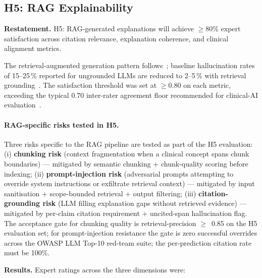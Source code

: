 
\subsection{H5: RAG Explainability}

\textbf{Restatement.} H5: RAG-generated explanations will achieve $\geq$80\% expert satisfaction across citation relevance, explanation coherence, and clinical alignment metrics.

\noindent The retrieval-augmented generation pattern follows~\cite{lewis2020rag}; baseline hallucination rates of 15--25\,\% reported for ungrounded LLMs are reduced to 2--5\,\% with retrieval grounding~\cite{gao2024rag}. The satisfaction threshold was set at $\geq$0.80 on each metric, exceeding the typical 0.70 inter-rater agreement floor recommended for clinical-AI evaluation~\cite{cohen1960kappa}.

\paragraph{RAG-specific risks tested in H5.}
Three risks specific to the RAG pipeline are tested as part of the H5 evaluation: (i) \textbf{chunking risk} (context fragmentation when a clinical concept spans chunk boundaries) --- mitigated by semantic chunking + chunk-quality scoring before indexing; (ii) \textbf{prompt-injection risk} (adversarial prompts attempting to override system instructions or exfiltrate retrieval context) --- mitigated by input sanitisation + scope-bounded retrieval + output filtering; (iii) \textbf{citation-grounding risk} (LLM filling explanation gaps without retrieved evidence) --- mitigated by per-claim citation requirement + uncited-span hallucination flag. The acceptance gate for chunking quality is retrieval-precision $\geq$~0.85 on the H5 evaluation set; for prompt-injection resistance the gate is zero successful overrides across the OWASP LLM Top-10 red-team suite; the per-prediction citation rate must be 100\%.

\textbf{Results.} Expert ratings across the three dimensions were:

